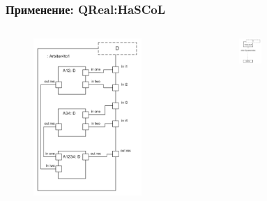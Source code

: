 \documentclass[14pt]{beamer}
\begin{document}
\begin{frame}
    \frametitle{Применение: QReal:HaSCoL}
    \begin{columns}[onlytextwidth]
       \begin{column}{0.35\textwidth}
            \begin{figure}
            	\begin{center}
             		\includegraphics[width=0.8\textwidth]{images/presentation/hascol1.png}\\
            	\end{center}
            \end{figure}
        \end{column}
        \begin{column}{0.65\textwidth}
            \begin{figure}
            	\begin{center}
             		\includegraphics[width=0.25\textwidth]{images/presentation/hascol3.png}\\

\end{center}
\end{figure}
\end{column}
\end{columns}
\end{frame}
\end{document}
